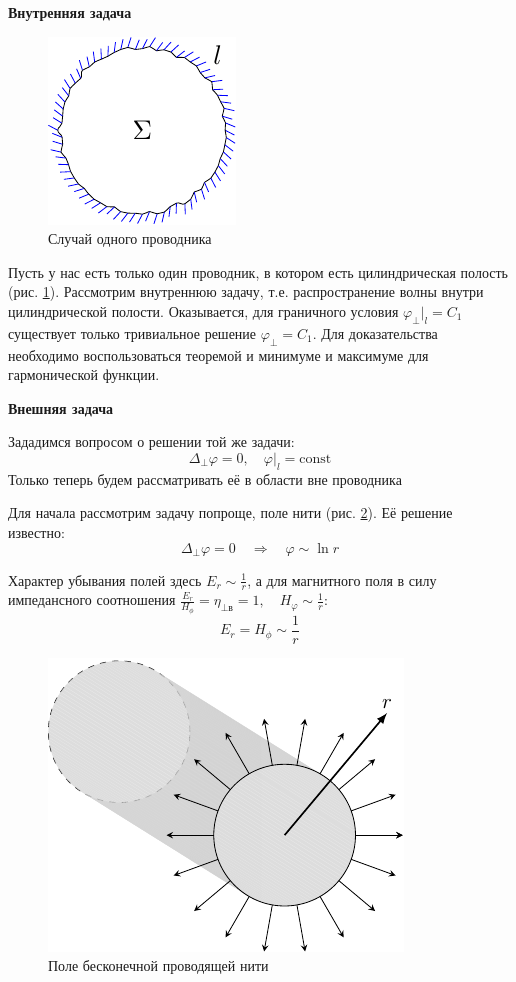 \textbf{Внутренняя задача}

\begin{figure}[h!]
	\centering
	\includegraphics[scale=1]{img/lect4_ris2}
	\caption{Случай одного проводника}
	\label{fig:lect4:2}
\end{figure}
Пусть у нас есть только один проводник, в котором есть цилиндрическая полость (рис. \ref{fig:lect4:2}). Рассмотрим внутреннюю задачу, т.е. распространение волны внутри цилиндрической полости. Оказывается, для граничного условия $\varphi_\perp|_l=C_1$ существует только тривиальное решение $\varphi_\perp=C_1$. Для доказательства необходимо воспользоваться теоремой и минимуме и максимуме для гармонической функции.

\textbf{Внешняя задача}

Зададимся вопросом о решении той же задачи:
\begin{equation*}
\Delta_\perp \varphi=0, \quad \varphi|_l=\mathrm{const}
\end{equation*}
Только теперь будем рассматривать её в области вне проводника

Для начала рассмотрим задачу попроще, поле нити (рис. \ref{fig:lect4:3}). Её решение известно:
\begin{equation*}
\Delta_\perp \varphi=0 
\quad \Rightarrow \quad
\varphi \sim \ln r
\end{equation*} 

Характер убывания полей здесь $\displaystyle E_r\sim \frac{1}{r}$, а для магнитного поля в силу импедансного соотношения
$\displaystyle\frac{E_r}{H_\phi}=\eta_{\perp\text{в}}=1, \quad H_\varphi\sim\frac{1}{r}$:
\begin{equation*}
E_r=H_\phi\sim\frac{1}{r}
\end{equation*}
\begin{figure}[h!]
	\centering
	\includegraphics[width =0.4\linewidth]{img/lect4_ris3}
	\caption{Поле бесконечной проводящей нити}
	\label{fig:lect4:3}
\end{figure}

